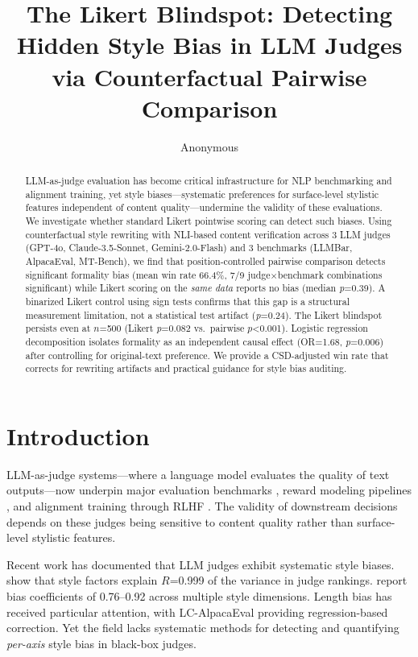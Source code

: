 \documentclass[11pt,a4paper]{article}
\title{The Likert Blindspot: Detecting Hidden Style Bias in LLM Judges\\via Counterfactual Pairwise Comparison}
\author{
Anonymous
}
\date{}
\newcommand{\pval}[1]{\textit{p}=#1}
\begin{document}
\maketitle

\begin{abstract}
LLM-as-judge evaluation has become critical infrastructure for NLP benchmarking and alignment training, yet style biases---systematic preferences for surface-level stylistic features independent of content quality---undermine the validity of these evaluations.
We investigate whether standard Likert pointwise scoring can detect such biases.
Using counterfactual style rewriting with NLI-based content verification across 3 LLM judges (GPT-4o, Claude-3.5-Sonnet, Gemini-2.0-Flash) and 3 benchmarks (LLMBar, AlpacaEval, MT-Bench), we find that position-controlled pairwise comparison detects significant formality bias (mean win rate 66.4\%, 7/9 judge$\times$benchmark combinations significant) while Likert scoring on the \emph{same data} reports no bias (median \pval{0.39}).
A binarized Likert control using sign tests confirms that this gap is a structural measurement limitation, not a statistical test artifact (\pval{0.24}).
The Likert blindspot persists even at $n$=500 (Likert \pval{0.082} vs.\ pairwise $p$<0.001).
Logistic regression decomposition isolates formality as an independent causal effect (OR=1.68, \pval{0.006}) after controlling for original-text preference.
We provide a CSD-adjusted win rate that corrects for rewriting artifacts and practical guidance for style bias auditing.
\end{abstract}

\section{Introduction}

LLM-as-judge systems---where a language model evaluates the quality of text outputs---now underpin major evaluation benchmarks \citep{zheng2023judging,li2024crowdsourced,dubois2024alpacafarm}, reward modeling pipelines \citep{ouyang2022training}, and alignment training through RLHF \citep{bai2022training}.
The validity of downstream decisions depends on these judges being sensitive to content quality rather than surface-level stylistic features.

Recent work has documented that LLM judges exhibit systematic style biases.
\citet{wu2024style} show that style factors explain $R$=0.999 of the variance in judge rankings.
\citet{chen2024soumik} report bias coefficients of 0.76--0.92 across multiple style dimensions.
Length bias has received particular attention, with LC-AlpacaEval \citep{dubois2024length} providing regression-based correction.
Yet the field lacks systematic methods for detecting and quantifying \emph{per-axis} style bias in black-box judges.
\end{document}
